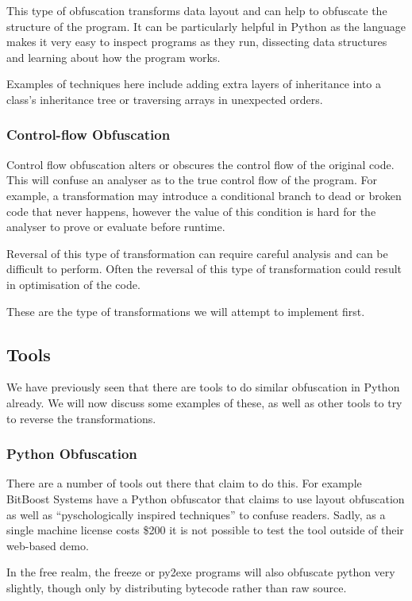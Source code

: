 \documentclass{report}
\begin{document}
This type of obfuscation transforms data layout and can help to obfuscate the structure of the program. It can be
particularly helpful in Python as the language makes it very easy to inspect programs as they run, dissecting data
structures and learning about how the program works.

Examples of techniques here include adding extra layers of inheritance into a class's inheritance tree or traversing arrays
in unexpected orders.

\subsubsection{Control-flow Obfuscation}

Control flow obfuscation alters or obscures the control flow of the original code. This will confuse an analyser as to the
true control flow of the program. For example, a transformation may introduce a conditional branch to dead or broken code
that never happens, however the value of this condition is hard for the analyser to prove or evaluate before runtime.

Reversal of this type of transformation can require careful analysis and can be difficult to perform. Often the reversal
of this type of transformation could result in optimisation of the code.

These are the type of transformations we will attempt to implement first.

\subsection{Tools}

We have previously seen that there are tools to do similar obfuscation in Python already. We will now discuss some
examples of these, as well as other tools to try to reverse the transformations.

\subsubsection{Python Obfuscation}

There are a number of tools out there that claim to do this. For example BitBoost Systems have a Python obfuscator \cite{bitboost}
that claims to use layout obfuscation as well as ``pyschologically inspired techniques'' to confuse readers. Sadly, as a
single machine license costs \$200 it is not possible to test the tool outside of their web-based demo.

In the free realm, the freeze \cite{freezereadme} or py2exe \cite{py2exe} programs will also obfuscate python very slightly,
though only by distributing bytecode rather than raw source.
\end{document}
